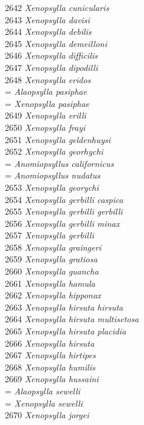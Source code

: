 \documentclass[
]{article}
\begin{document}
2642 \emph{Xenopsylla cunicularis}\\
2643 \emph{Xenopsylla davisi}\\
2644 \emph{Xenopsylla debilis}\\
2645 \emph{Xenopsylla demeilloni}\\
2646 \emph{Xenopsylla difficilis}\\
2647 \emph{Xenopsylla dipodilli}\\
2648 \emph{Xenopsylla eridos}\\
= \emph{Alaopsylla pasiphae}\\
= \emph{Xenopsylla pasiphae}\\
2649 \emph{Xenopsylla erilli}\\
2650 \emph{Xenopsylla frayi}\\
2651 \emph{Xenopsylla geldenhuysi}\\
2652 \emph{Xenopsylla georhychi}\\
= \emph{Anomiopsyllus californicus}\\
= \emph{Anomiopsyllus nudatus}\\
2653 \emph{Xenopsylla georychi}\\
2654 \emph{Xenopsylla gerbilli caspica}\\
2655 \emph{Xenopsylla gerbilli gerbilli}\\
2656 \emph{Xenopsylla gerbilli minax}\\
2657 \emph{Xenopsylla gerbilli}\\
2658 \emph{Xenopsylla graingeri}\\
2659 \emph{Xenopsylla gratiosa}\\
2660 \emph{Xenopsylla guancha}\\
2661 \emph{Xenopsylla hamula}\\
2662 \emph{Xenopsylla hipponax}\\
2663 \emph{Xenopsylla hirsuta hirsuta}\\
2664 \emph{Xenopsylla hirsuta multisetosa}\\
2665 \emph{Xenopsylla hirsuta placidia}\\
2666 \emph{Xenopsylla hirsuta}\\
2667 \emph{Xenopsylla hirtipes}\\
2668 \emph{Xenopsylla humilis}\\
2669 \emph{Xenopsylla hussaini}\\
= \emph{Alaopsylla sewelli}\\
= \emph{Xenopsylla sewelli}\\
2670 \emph{Xenopsylla jorgei}\\
\end{document}
